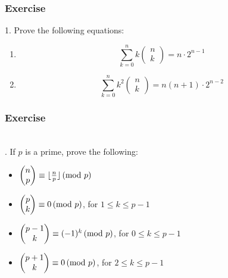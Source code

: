 \documentclass{beamer}
\begin{document}
\begin{frame}
    \frametitle{Exercise}
    1.  Prove the following equations:
    \begin{enumerate}
        \item $$\sum\limits_{k=0}^{n} k \begin{pmatrix} n\\k	\end{pmatrix} = n\cdot 2^{n-1}$$
        \item $$\sum\limits_{k=0}^{n} k^2 \begin{pmatrix} n\\k	\end{pmatrix} = n(n+1)\cdot 2^{n-2}$$
    \end{enumerate}
\end{frame}

\begin{frame}
    \frametitle{Exercise}
    \\. If $p$ is a prime, prove the following:
    \begin{itemize}
        \item $\begin{pmatrix} {n}\\{p} \end{pmatrix}\equiv\lfloor {\frac{n}{p}} \rfloor\,(\text{mod } {p})$
        \item $\begin{pmatrix} {p}\\{k} \end{pmatrix}\equiv0\,(\text{mod } {p})$, for $1\leq k\leq p-1$
        \item $\begin{pmatrix} {p-1}\\{k} \end{pmatrix}\equiv(-1)^k \,(\text{mod } {p})$, for $0\leq k\leq p-1$
        \item $\begin{pmatrix} {p+1}\\{k} \end{pmatrix}\equiv 0\,(\text{mod } {p})$, for $2\leq k\leq p-1$
    \end{itemize}
\end{frame}
\end{document}
